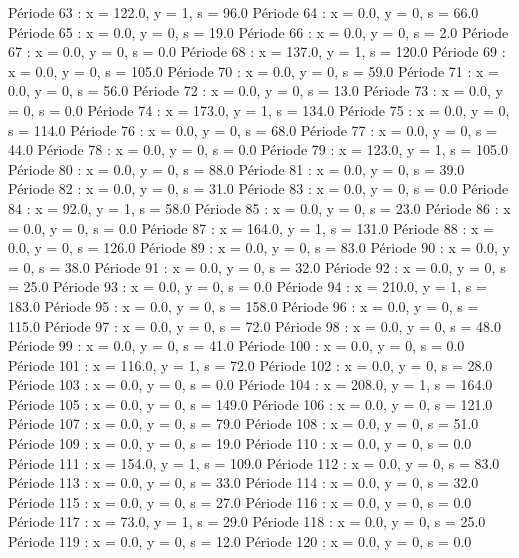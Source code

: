 Période 63 : x = 122.0, y = 1, s = 96.0
Période 64 : x = 0.0, y = 0, s = 66.0
Période 65 : x = 0.0, y = 0, s = 19.0
Période 66 : x = 0.0, y = 0, s = 2.0
Période 67 : x = 0.0, y = 0, s = 0.0
Période 68 : x = 137.0, y = 1, s = 120.0
Période 69 : x = 0.0, y = 0, s = 105.0
Période 70 : x = 0.0, y = 0, s = 59.0
Période 71 : x = 0.0, y = 0, s = 56.0
Période 72 : x = 0.0, y = 0, s = 13.0
Période 73 : x = 0.0, y = 0, s = 0.0
Période 74 : x = 173.0, y = 1, s = 134.0
Période 75 : x = 0.0, y = 0, s = 114.0
Période 76 : x = 0.0, y = 0, s = 68.0
Période 77 : x = 0.0, y = 0, s = 44.0
Période 78 : x = 0.0, y = 0, s = 0.0
Période 79 : x = 123.0, y = 1, s = 105.0
Période 80 : x = 0.0, y = 0, s = 88.0
Période 81 : x = 0.0, y = 0, s = 39.0
Période 82 : x = 0.0, y = 0, s = 31.0
Période 83 : x = 0.0, y = 0, s = 0.0
Période 84 : x = 92.0, y = 1, s = 58.0
Période 85 : x = 0.0, y = 0, s = 23.0
Période 86 : x = 0.0, y = 0, s = 0.0
Période 87 : x = 164.0, y = 1, s = 131.0
Période 88 : x = 0.0, y = 0, s = 126.0
Période 89 : x = 0.0, y = 0, s = 83.0
Période 90 : x = 0.0, y = 0, s = 38.0
Période 91 : x = 0.0, y = 0, s = 32.0
Période 92 : x = 0.0, y = 0, s = 25.0
Période 93 : x = 0.0, y = 0, s = 0.0
Période 94 : x = 210.0, y = 1, s = 183.0
Période 95 : x = 0.0, y = 0, s = 158.0
Période 96 : x = 0.0, y = 0, s = 115.0
Période 97 : x = 0.0, y = 0, s = 72.0
Période 98 : x = 0.0, y = 0, s = 48.0
Période 99 : x = 0.0, y = 0, s = 41.0
Période 100 : x = 0.0, y = 0, s = 0.0
Période 101 : x = 116.0, y = 1, s = 72.0
Période 102 : x = 0.0, y = 0, s = 28.0
Période 103 : x = 0.0, y = 0, s = 0.0
Période 104 : x = 208.0, y = 1, s = 164.0
Période 105 : x = 0.0, y = 0, s = 149.0
Période 106 : x = 0.0, y = 0, s = 121.0
Période 107 : x = 0.0, y = 0, s = 79.0
Période 108 : x = 0.0, y = 0, s = 51.0
Période 109 : x = 0.0, y = 0, s = 19.0
Période 110 : x = 0.0, y = 0, s = 0.0
Période 111 : x = 154.0, y = 1, s = 109.0
Période 112 : x = 0.0, y = 0, s = 83.0
Période 113 : x = 0.0, y = 0, s = 33.0
Période 114 : x = 0.0, y = 0, s = 32.0
Période 115 : x = 0.0, y = 0, s = 27.0
Période 116 : x = 0.0, y = 0, s = 0.0
Période 117 : x = 73.0, y = 1, s = 29.0
Période 118 : x = 0.0, y = 0, s = 25.0
Période 119 : x = 0.0, y = 0, s = 12.0
Période 120 : x = 0.0, y = 0, s = 0.0




